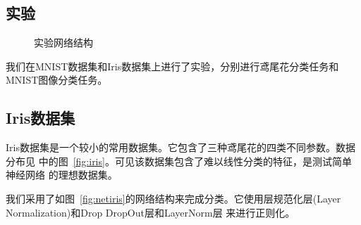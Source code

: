 \documentclass[a4paper,twoside,twocolumn]{article}
\begin{document}
\begin{spacing}{1.2}
\section{实验}

\begin{figure}[htb]
	\centering
	\hspace*{1cm} 
	\caption{实验网络结构}
	\label{fig:networks}
\end{figure}

我们在MNIST数据集和Iris数据集上进行了实验，分别进行鸢尾花分类任务和MNIST图像分类任务。


\subsection{Iris数据集}

Iris数据集是一个较小的常用数据集。它包含了三种鸢尾花的四类不同参数。数据分布见
中的图~\ref{fig:iris}。可见该数据集包含了难以线性分类的特征，是测试简单神经网络
的理想数据集。

我们采用了如图~\ref{fig:netiris}的网络结构来完成分类。它使用层规范化层(Layer Normalization)和Drop DropOut层和LayerNorm层
来进行正则化。


\end{spacing}
\end{document}
